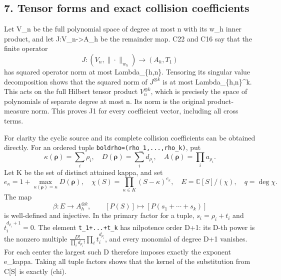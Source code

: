 \documentclass[11pt]{article}
\begin{document}
\subsection{7. Tensor forms and exact collision coefficients}\label{mrcoerc:tensor-forms-and-exact-collision-coefficients}

Let V\_n be the full polynomial space of degree at most n with its w\_h inner product, and let J:V\_n-\textgreater A\_h be the remainder map. C22 and C16 say that the finite operator \[
J:(V_n,\|\cdot\|_{w_h})\longrightarrow(A_h,T_1)
\] has squared operator norm at most Lambda\_\{h,n\}. Tensoring its singular value decomposition shows that the squared norm of \(J^{\otimes k}\) is at most Lambda\_\{h,n\}\^{}k. This acts on the full Hilbert tensor product \(V_n^{\otimes k}\), which is precisely the space of polynomials of separate degree at most n. Its norm is the original product-measure norm. This proves J1 for every coefficient vector, including all cross terms.

For clarity the cyclic source and its complete collision coefficients can be obtained directly. For an ordered tuple \texttt{boldrho=(rho\_1,...,rho\_k)}, put \[
\kappa(\boldsymbol\rho)=\sum_i\rho_i,\quad
D(\boldsymbol\rho)=\sum_i d_{\rho_i},\quad
A(\boldsymbol\rho)=\prod_i a_{\rho_i}.
\] Let K be the set of distinct attained kappa, and set \[
e_\kappa=1+\max_{\kappa(\boldsymbol\rho)=\kappa}D(\boldsymbol\rho),
\quad \chi(S)=\prod_{\kappa\in K}(S-\kappa)^{e_\kappa},
\quad E=\mathbb C[S]/(\chi),\quad q=\deg\chi.
\] The map \[
\beta:E\longrightarrow A_h^{\otimes k},\qquad
[P(S)]\longmapsto[P(s_1+\cdots+s_k)]
\tag{C23}
\] is well-defined and injective. In the primary factor for a tuple, \(s_i=\rho_i+t_i\) and \(t_i^{d_{\rho_i}+1}=0\). The element \texttt{t\_1+...+t\_k} has nilpotence order D+1: its D-th power is the nonzero multiple \(\displaystyle\frac{D!}{\prod_i d_{\rho_i}!}\prod_i t_i^{d_{\rho_i}}\), and every monomial of degree D+1 vanishes. For each center the largest such D therefore imposes exactly the exponent e\_kappa. Taking all tuple factors shows that the kernel of the substitution from C{[}S{]} is exactly (chi).
\end{document}
